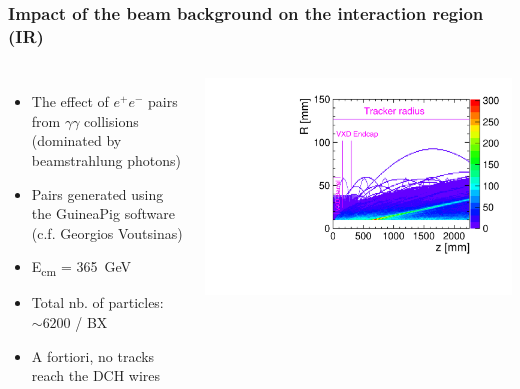 \documentclass[aspectratio=169, hyperref={colorlinks=true,pdfpagelabels=false,linkcolor=black}, xcolor=dvipsnames,10pt]{beamer}
\begin{document}
\begin{frame}
	
\end{frame}


\begin{frame}
	\frametitle{Impact of the beam background on the interaction region (IR)}

	\begin{columns}
	\begin{itemize}
	\item The effect of $e^{+}e^{-}$ pairs from $\gamma\gamma$ collisions (dominated by beamstrahlung photons)
	\item Pairs generated using the GuineaPig software (c.f. Georgios Voutsinas)
	\item E\textsubscript{cm} = 365~GeV
	\item Total nb. of particles: $\sim6200$ / BX
        \item A fortiori, no tracks reach the DCH wires\vspace{0.2cm}
	\end{itemize}		
		\centering
		\includegraphics[width=\textwidth]{../figures/pairs_R_Z_legend.pdf}
	\end{columns}	
	
\end{frame}
\end{document}
